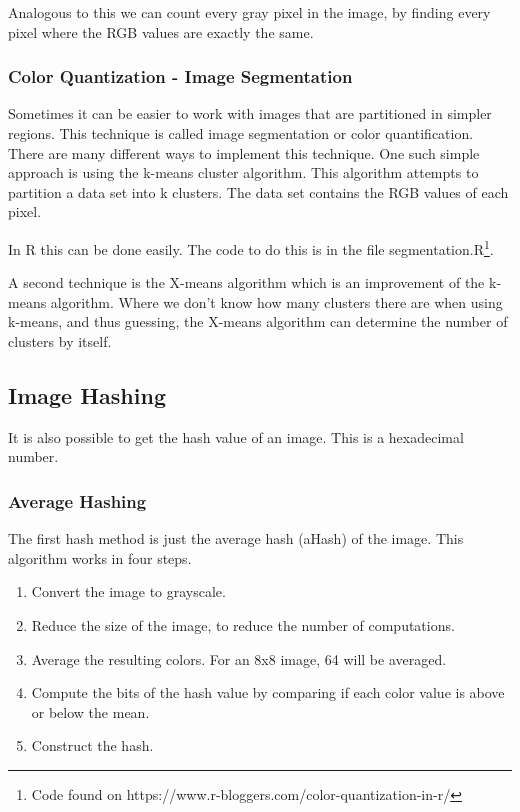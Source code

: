 \documentclass[12pt]{article}
\begin{document}
Analogous to this we can count every gray pixel in the image, by finding every pixel where the RGB values are exactly the same.

\subsubsection{Color Quantization - Image Segmentation}

Sometimes it can be easier to work with images that are partitioned in simpler regions. This technique is called image segmentation or color quantification. There are many different ways to implement this technique. One such simple approach is using the k-means cluster algorithm. This algorithm attempts to partition a data set into k clusters. The data set contains the RGB values of each pixel.

In R this can be done easily. The code to do this is in the file segmentation.R\footnote{Code found on https://www.r-bloggers.com/color-quantization-in-r/}.
\newline

A second technique is the X-means algorithm which is an improvement of the k-means algorithm. Where we don't know how many clusters there are when using k-means, and thus guessing, the X-means algorithm can determine the number of clusters by itself.

\subsection{Image Hashing}
It is also possible to get the hash value of an image. This is a hexadecimal number.

\subsubsection{Average Hashing}
The first hash method is just the average hash (aHash) of the image. This algorithm works in four steps.

\begin{enumerate}
        \item Convert the image to grayscale. 
        \item Reduce the size of the image, to reduce the number of computations.
        \item Average the resulting colors. For an 8x8 image, 64 will be averaged.
        \item Compute the bits of the hash value by comparing if each color value is above or below the mean.
        \item Construct the hash.
\end{enumerate}
\end{document}
